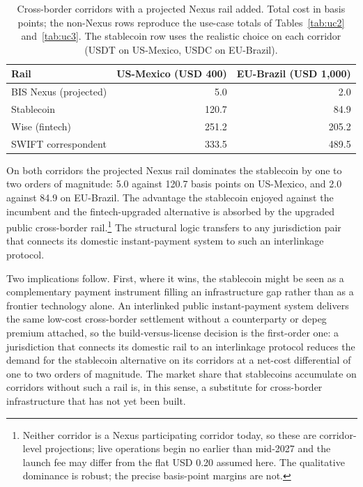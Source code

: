 \begin{table}[H]
\centering
\caption{Cross-border corridors with a projected Nexus rail added. Total cost in basis points; the non-Nexus rows reproduce the use-case totals of Tables~\ref{tab:uc2} and~\ref{tab:uc3}. The stablecoin row uses the realistic choice on each corridor (USDT on US-Mexico, USDC on EU-Brazil).}\label{tab:nexus_cross_border}
\begin{tabular}{lrr}
\toprule
Rail & US-Mexico (USD 400) & EU-Brazil (USD 1{,}000) \\
\midrule
BIS Nexus (projected) & 5.0   & 2.0   \\
Stablecoin            & 120.7 & 84.9  \\
Wise (fintech)        & 251.2 & 205.2 \\
SWIFT correspondent   & 333.5 & 489.5 \\
\bottomrule
\end{tabular}
\end{table}

On both corridors the projected Nexus rail dominates the stablecoin by one to two orders of magnitude: 5.0 against 120.7 basis points on US-Mexico, and 2.0 against 84.9 on EU-Brazil. The advantage the stablecoin enjoyed against the incumbent and the fintech-upgraded alternative is absorbed by the upgraded public cross-border rail.\footnote{Neither corridor is a Nexus participating corridor today, so these are corridor-level projections; live operations begin no earlier than mid-2027 and the launch fee may differ from the flat USD 0.20 assumed here. The qualitative dominance is robust; the precise basis-point margins are not.} The structural logic transfers to any jurisdiction pair that connects its domestic instant-payment system to such an interlinkage protocol.

Two implications follow. First, where it wins, the stablecoin might be seen as a complementary payment instrument filling an infrastructure gap rather than as a frontier technology alone. An interlinked public instant-payment system delivers the same low-cost cross-border settlement without a counterparty or depeg premium attached, so the build-versus-license decision is the first-order one: a jurisdiction that connects its domestic rail to an interlinkage protocol reduces the demand for the stablecoin alternative on its corridors at a net-cost differential of one to two orders of magnitude. The market share that stablecoins accumulate on corridors without such a rail is, in this sense, a substitute for cross-border infrastructure that has not yet been built.

